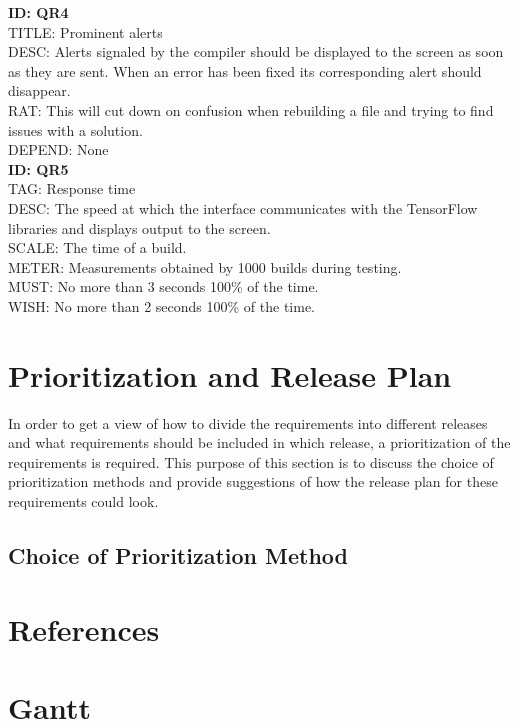 \documentclass[a4paper,10pt]{article} \usepackage[margin=1.0in]{geometry} \usepackage{pdfpages} \usepackage{graphicx}
\begin{document}
\noindent
\textbf{ID: QR4}\\
TITLE: Prominent alerts\\
DESC: Alerts signaled by the compiler should be displayed to the screen as soon as they are sent. 
When an error has been fixed its corresponding alert should disappear.\\
RAT: This will cut down on confusion when rebuilding a file and trying to find issues with a solution.\\
DEPEND: None\\

\noindent
\textbf{ID: QR5}\\
TAG: Response time\\
DESC: The speed at which the interface communicates with the TensorFlow libraries and displays output to the screen.\\
SCALE: The time of a build.\\
METER: Measurements obtained by 1000 builds during testing.\\
MUST: No more than 3 seconds 100\% of the time.\\
WISH: No more than 2 seconds 100\% of the time.\\

\newpage

\section{Prioritization and Release Plan}

In order to get a view of how to divide the requirements into different releases and what requirements should be included in which release, a prioritization of the requirements is required. 
This purpose of this section is to discuss the choice of prioritization methods and provide suggestions of how the release plan for these requirements could look.

\subsection{Choice of Prioritization Method}

\newpage
\section{References}
\newpage

\section{Gantt}
\end{document}
